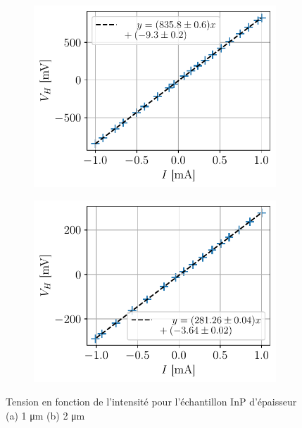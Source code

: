 \begin{figure}[h]
    \centering
    \begin{subfigure}{0.45\textwidth}
        \centering
        \includegraphics[width=\textwidth]{figures/U(I),InP1micro.pdf}
        \caption{}
    \end{subfigure}
    \begin{subfigure}{0.45\textwidth}
        \centering
        \includegraphics[width=\textwidth]{figures/U(I),InP2micro.pdf}
        \caption{}
    \end{subfigure}
    \caption{Tension en fonction de l'intensité pour l'échantillon InP d'épaisseur (a) 1 \si{\micro\meter} (b) 2 \si{\micro\meter}}
\end{figure}


